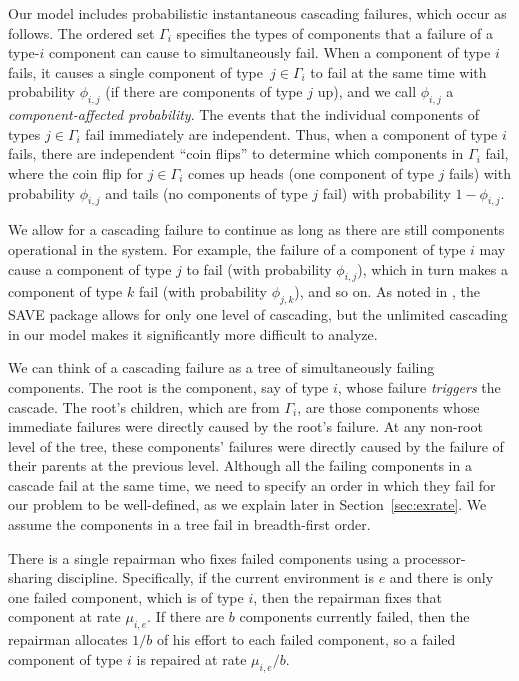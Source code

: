 \documentclass[12pt]{article}
\begin{document}
Our model includes probabilistic instantaneous cascading failures, which occur
as follows. The ordered set $\Gamma_i$ specifies the types of components that a
failure of a type-$i$ component can cause to simultaneously fail. When a
component of type $i$ fails, it causes a single  component of type~$j \in
\Gamma_i$ to fail at the same time with probability $\phi_{i, j}$ (if there are
components of type $j$ up), and we call 
$\phi_{i, j}$  a \textit{component-affected probability}. The events that the individual components of types $j \in
\Gamma_i$ fail immediately are independent. Thus, when a component of type $i$
fails, there are independent ``coin flips'' to determine which components in
$\Gamma_i$ fail, where the coin flip for $j \in \Gamma_i$ comes up heads (one
component of type $j$ fails) with probability $\phi_{i, j}$ and tails (no
components of type $j$ fail) with probability $1 - \phi_{i, j}$.

We allow for a cascading failure to continue as long as there are still
components operational in the system.  For example, the failure of a component
of type $i$ may cause a component of type $j$ to fail (with probability
$\phi_{i, j}$), which in turn makes a component of type $k$ fail (with
probability $\phi_{j, k}$), and so on. As noted in \cite{ING:2009}, the SAVE
package \cite{BHLNS:1994} allows for only one level of cascading, but the
unlimited cascading in our model makes it significantly more difficult to
analyze.

We can think of a cascading failure as a tree of simultaneously failing
components. The root is the component, say of type $i$, whose failure
\textit{triggers} the cascade. The root's children, which are from $\Gamma_i$,
are those components whose immediate failures were directly caused by the root's
failure. At any non-root level of the tree,  these components' failures were
directly caused by the failure of their parents at the previous level. Although
all the failing components in a cascade fail at the same time, we need to
specify an order in which they fail for our problem to be well-defined, as we
explain later in Section~\ref{sec:exrate}. We assume the components in a tree
fail in breadth-first order.

There is a single repairman who fixes failed components using a processor-
sharing discipline. Specifically, if the current environment is $e$ and there is
only one failed component, which is of type $i$, then the repairman fixes that
component at rate $\mu_{i, e}$. If there are $b$ components currently failed,
then the repairman allocates $1 / b$ of his effort to each failed component, so
a failed component of type $i$ is repaired at rate $\mu_{i, e}/b$.
\end{document}
